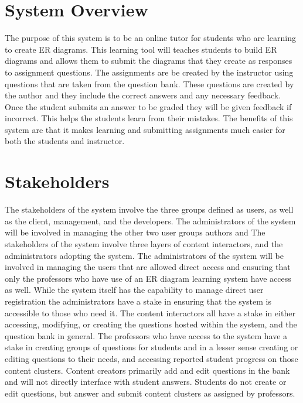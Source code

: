 \chapter {System Overview}

The purpose of this system is to be an online tutor for students who are learning to create ER diagrams. This learning tool will teaches students to build ER diagrams and allows them to submit the diagrams that they create as responses to assignment questions. The assignments are be created by the instructor using questions that are taken from the question bank. These questions are created by the author and they include the correct answers and any necessary feedback. Once the student submits an answer to be graded they will be given feedback if incorrect. This helps the students learn from their mistakes. The benefits of this system are that it makes learning and submitting assignments much easier for both the students and instructor.

\chapter{Stakeholders}
The stakeholders of the system involve the three groups defined as users, as well as the client, management, and the developers. The administrators of the system will be involved in managing the other two user groups authors and 
The stakeholders of the system involve three layers of content interactors, and the administrators adopting the system. The administrators of the system will be involved in managing the users that are allowed direct access and ensuring that only the professors who have use of an ER diagram learning system have access as well. While the system itself has the capability to manage direct user registration the administrators have a stake in ensuring that the system is accessible to those who need it. The content interactors all have a stake in either accessing, modifying, or creating the questions hosted within the system, and the question bank in general. The professors who have access to the system have a stake in creating groups of questions for students and in a lesser sense creating or editing questions to their needs, and accessing reported student progress on those content clusters. Content creators primarily add and edit questions in the bank and will not directly interface with student answers. Students do not create or edit questions, but answer and submit content clusters as assigned by professors. 

